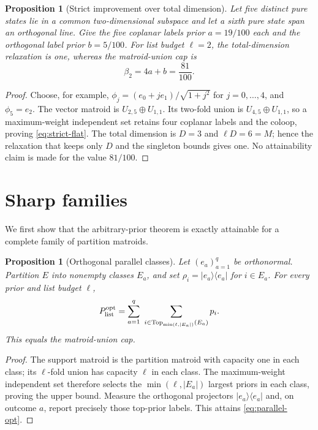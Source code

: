 \documentclass[11pt]{article}
\newtheorem{proposition}[theorem]{Proposition}
\theoremstyle{definition}
\theoremstyle{remark}
\newcommand{\ket}[1]{\lvert #1\rangle}
\newcommand{\bra}[1]{\langle #1\rvert}
\begin{document}
\begin{proposition}[Strict improvement over total dimension]\label{prop:strict-flat}
Let five distinct pure states lie in a common two-dimensional subspace and
let a sixth pure state span an orthogonal line.  Give the five coplanar labels
prior $a=19/100$ each and the orthogonal label prior $b=5/100$.  For list
budget $\ell=2$, the total-dimension relaxation is one, whereas the
matroid-union cap is
\begin{equation}\label{eq:strict-flat}
 \beta_2=4a+b=\frac{81}{100}.
\end{equation}
\end{proposition}

\begin{proof}
Choose, for example,
$\phi_j=(e_0+j e_1)/\sqrt{1+j^2}$ for $j=0,\ldots,4$, and
$\phi_5=e_2$.  The vector matroid is
$U_{2,5}\oplus U_{1,1}$.  Its two-fold union is
$U_{4,5}\oplus U_{1,1}$, so a maximum-weight independent set retains four
coplanar labels and the coloop, proving \eqref{eq:strict-flat}.  The total
dimension is $D=3$ and $\ell D=6=M$; hence the relaxation that keeps only
$D$ and the singleton bounds gives one.  No attainability claim is made for
the value $81/100$.
\end{proof}

\section{Sharp families}\label{sec:sharp}

We first show that the arbitrary-prior theorem is exactly attainable for a
complete family of partition matroids.

\begin{proposition}[Orthogonal parallel classes]\label{prop:parallel}
Let $(e_a)_{a=1}^q$ be orthonormal.  Partition $E$ into nonempty classes
$E_a$, and set $\rho_i=\ket{e_a}\!\bra{e_a}$ for $i\in E_a$.  For every
prior and list budget $\ell$,
\begin{equation}\label{eq:parallel-opt}
 P_{\rm list}^{\rm opt}
 =\sum_{a=1}^q\ 
   \sum_{i\in\operatorname{Top}_{\min(\ell,|E_a|)}(E_a)}p_i.
\end{equation}
This equals the matroid-union cap.
\end{proposition}

\begin{proof}
The support matroid is the partition matroid with capacity one in each class;
its $\ell$-fold union has capacity $\ell$ in each class.  The
maximum-weight independent set therefore selects the $\min(\ell,|E_a|)$
largest priors in each class, proving the upper bound.  Measure the orthogonal
projectors $\ket{e_a}\!\bra{e_a}$ and, on outcome $a$, report precisely those
top-prior labels.  This attains \eqref{eq:parallel-opt}.
\end{proof}
\end{document}
